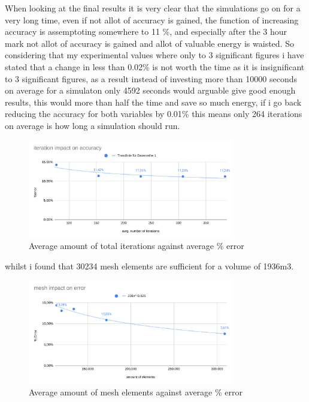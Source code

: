 \documentclass[12pt,a4paper]{article}
\begin{document}
When looking at the final results it is very clear that the simulations go on for a very long time, even if not allot of accuracy is gained, the function of increasing accuracy is assemptoting somewhere to 11 \%, and especially after the 3 hour mark not allot of accuracy is gained and allot of valuable energy is waisted. So considering that my experimental values where only to 3 significant figures i have stated that a change in less than 0.02\% is not worth the time as it is insignificant to 3 significant figures, as a result instead of investing more than 10000 seconds on average for a simulaton only 4592 seconds would arguable give good enough results, this would more than half the time and save so much energy, if i go back reducing the accuracy for both variables by 0.01\% this means only 264 iterations on average is how long a simulation should run.

\begin{figure}[H]
\centering
\includegraphics[width=0.8\textwidth]{image11.png}
\caption{Average amount of total iterations against average \% error}
\end{figure}

whilst i found that 30234 mesh elements are sufficient for a volume of 1936m3.

\begin{figure}[H]
\centering
\includegraphics[width=0.8\textwidth]{image2.png}
\caption{Average amount of mesh elements against average \% error}
\end{figure}
\end{document}

